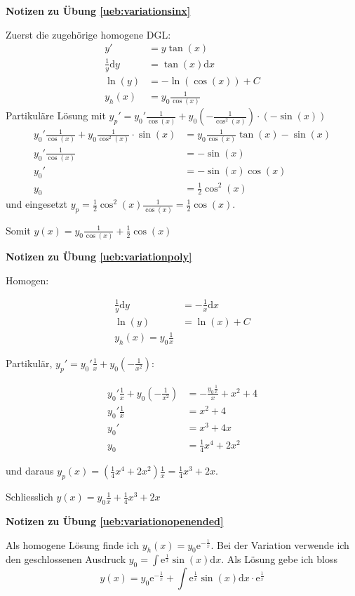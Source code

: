 \documentclass[%
11pt,%
twoside,%
titlepage,%
swissgerman,%
headsepline%
]{scrartcl}
\newcommand{\faReturnGray}{\textcolor{gray}{\faMailReply}} %
\theoremstyle{definition}
\theoremstyle{plain}
\newcommand{\concatueb}[1]{ueb:#1}%
\newcommand{\concatlsg}[1]{lsg:#1}%
\newenvironment{lsg}[1]{%
    \par\noindent\textbf{Notizen zu Übung \ref{\concatueb{#1}}}\label{\concatlsg{#1}}
    \hfill\hyperref[\concatueb{#1}]{\faReturnGray}\par %
}{%
    \par%
}
\begin{document}
\begin{lsg}{variationsinx}
Zuerst die zugehörige homogene DGL:
    \begin{align*}
        y' &= y\tan(x)\\
        \frac{1}{y}\mathrm{d}y &= \tan(x)\mathrm{d}x\\
        \ln(y) &= -\ln(\cos(x))+C\\
        y_h(x) &= y_0\frac{1}{\cos(x)}
    \end{align*}
    Partikuläre Lösung mit $y_p' = y_0'\frac{1}{\cos(x)}+y_0(-\frac{1}{\cos^2(x)})\cdot(-\sin(x))$
    \begin{align*}
        y_0'\frac{1}{\cos(x)}+y_0\frac{1}{\cos^2(x)}\cdot\sin(x) &= y_0\frac{1}{\cos(x)}\tan(x)-\sin(x)\\
        y_0'\frac{1}{\cos(x)} &= -\sin(x)\\
        y_0' &= -\sin(x)\cos(x)\\
        y_0 &= \frac{1}{2}\cos^2(x)
    \end{align*}
    und eingesetzt $y_p=\frac{1}{2}\cos^2(x)\frac{1}{\cos(x)}=\frac{1}{2}{\cos(x)}$.

    Somit $y(x)=y_0\frac{1}{\cos(x)}+\frac{1}{2}{\cos(x)}$
\end{lsg}
\begin{lsg}{variationpoly}
    Homogen:

    \begin{align*}
        \frac{1}{y}\mathrm{d}y &= -\frac{1}{x}\mathrm{d}x\\
        \ln(y) &= \ln(x) +C\\
        y_h(x) = y_0\frac{1}{x}
    \end{align*}

    Partikulär, $y_p' = y_0'\frac{1}{x}+y_0(-\frac{1}{x^2})$:

    \begin{align*}
        y_0'\frac{1}{x}+y_0(-\frac{1}{x^2}) &= -\frac{y_0\frac{1}{x}}{x}+x^2+4\\
        y_0'\frac{1}{x} &= x^2+4\\
        y_0' &= x^3+4x\\
        y_0 &= \frac{1}{4}x^4+2x^2
    \end{align*}

    und daraus $y_p(x)=(\frac{1}{4}x^4+2x^2)\frac{1}{x}=\frac{1}{4}x^3+2x$.

    Schliesslich $y(x)=y_0\frac{1}{x}+\frac{1}{4}x^3+2x$
\end{lsg}
\begin{lsg}{variationopenended}
Als homogene Lösung finde ich $y_h(x)=y_0\mathrm{e}^{-\frac{1}{x}}$. Bei der Variation verwende ich den geschlossenen Ausdruck $y_0=\int \mathrm{e}^{\frac{1}{x}}\sin(x)\mathrm{d}x$. Als Lösung gebe ich bloss
$$y(x)=y_0\mathrm{e}^{-\frac{1}{x}}+\int \mathrm{e}^{\frac{1}{x}}\sin(x)\mathrm{d}x\cdot\mathrm{e}^{\frac{1}{x}}$$
\end{lsg}
\end{document}
